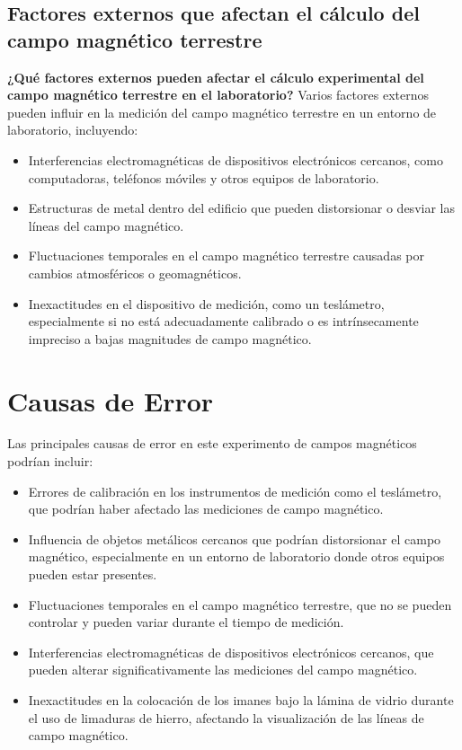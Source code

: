 \subsection{Factores externos que afectan el cálculo del campo magnético terrestre}
\textbf{¿Qué factores externos pueden afectar el cálculo experimental del campo magnético terrestre en el laboratorio?}
Varios factores externos pueden influir en la medición del campo magnético terrestre en un entorno de laboratorio, incluyendo:
\begin{itemize}
    \item Interferencias electromagnéticas de dispositivos electrónicos cercanos, como computadoras, teléfonos móviles y otros equipos de laboratorio.
    \item Estructuras de metal dentro del edificio que pueden distorsionar o desviar las líneas del campo magnético.
    \item Fluctuaciones temporales en el campo magnético terrestre causadas por cambios atmosféricos o geomagnéticos.
    \item Inexactitudes en el dispositivo de medición, como un teslámetro, especialmente si no está adecuadamente calibrado o es intrínsecamente impreciso a bajas magnitudes de campo magnético.
\end{itemize}


\section{Causas de Error}
Las principales causas de error en este experimento de campos magnéticos podrían incluir:
\begin{itemize}
    \item Errores de calibración en los instrumentos de medición como el teslámetro, que podrían haber afectado las mediciones de campo magnético.
    \item Influencia de objetos metálicos cercanos que podrían distorsionar el campo magnético, especialmente en un entorno de laboratorio donde otros equipos pueden estar presentes.
    \item Fluctuaciones temporales en el campo magnético terrestre, que no se pueden controlar y pueden variar durante el tiempo de medición.
    \item Interferencias electromagnéticas de dispositivos electrónicos cercanos, que pueden alterar significativamente las mediciones del campo magnético.
    \item Inexactitudes en la colocación de los imanes bajo la lámina de vidrio durante el uso de limaduras de hierro, afectando la visualización de las líneas de campo magnético.
\end{itemize}

